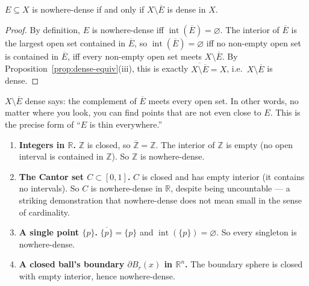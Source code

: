 
\begin{proposition}
\label{prop:nowhere-dense-equiv}
$E \subseteq X$ is nowhere-dense if and only if $X \setminus \overline{E}$
is dense in $X$.
\end{proposition}

\begin{proof}
By definition, $E$ is nowhere-dense iff $\operatorname{int}(\overline{E}) = \varnothing$.
The interior of $\overline{E}$ is the largest open set contained in
$\overline{E}$, so $\operatorname{int}(\overline{E}) = \varnothing$ iff no
non-empty open set is contained in $\overline{E}$, iff every non-empty open
set meets $X \setminus \overline{E}$.
By Proposition~\ref{prop:dense-equiv}(iii), this is exactly
$\overline{X \setminus \overline{E}} = X$, i.e.\ $X \setminus \overline{E}$
is dense.
\end{proof}

\begin{remark*}
$X \setminus \overline{E}$ dense says: the complement of $\overline{E}$
meets every open set.
In other words, no matter where you look, you can find points
that are not even close to $E$.
This is the precise form of ``$E$ is thin everywhere.''
\end{remark*}


\begin{example}
\label{ex:nowhere-dense}
\begin{enumerate}[label=(\alph*)]
  \item \textbf{Integers in $\mathbb{R}$.}
        $\mathbb{Z}$ is closed, so $\overline{\mathbb{Z}} = \mathbb{Z}$.
        The interior of $\mathbb{Z}$ is empty (no open interval is contained
        in $\mathbb{Z}$). So $\mathbb{Z}$ is nowhere-dense.

  \item \textbf{The Cantor set $C \subset [0,1]$.}
        $C$ is closed and has empty interior (it contains no intervals).
        So $C$ is nowhere-dense in $\mathbb{R}$,
        despite being uncountable --- a striking demonstration that
        nowhere-dense does not mean small in the sense of cardinality.

  \item \textbf{A single point $\{p\}$.}
        $\overline{\{p\}} = \{p\}$ and $\operatorname{int}(\{p\}) = \varnothing$.
        So every singleton is nowhere-dense.

  \item \textbf{A closed ball's boundary $\partial B_r(x)$ in $\mathbb{R}^n$.}
        The boundary sphere is closed with empty interior, hence nowhere-dense.
\end{enumerate}
\end{example}

